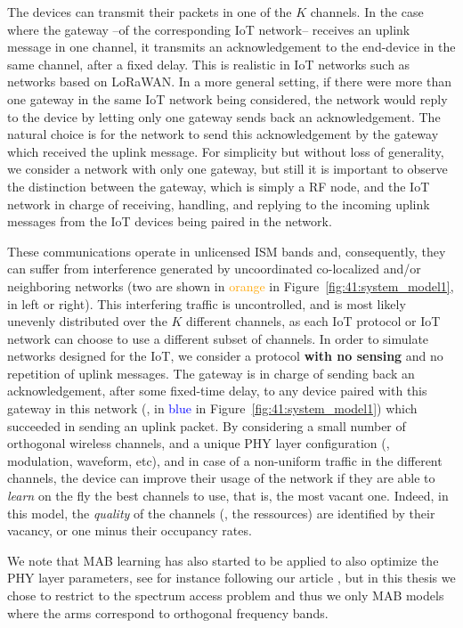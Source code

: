 The devices can transmit their packets in one of the $K$ channels. In the case where the gateway --of the corresponding IoT network-- receives an uplink message in one channel, it transmits an acknowledgement to the end-device in the same channel, after a fixed delay.
This is realistic in IoT networks such as networks based on LoRaWAN.
In a more general setting, if there were more than one gateway in the same IoT network being considered, the network would reply to the device by letting only one gateway sends back an acknowledgement.
The natural choice is for the network to send this acknowledgement by the gateway which received the uplink message.
For simplicity but without loss of generality, we consider a network with only one gateway,
but still it is important to observe the distinction between the gateway, which is simply a RF node, and the IoT network in charge of receiving, handling, and replying to the incoming uplink messages from the IoT devices being paired in the network.
%

These communications operate in unlicensed ISM bands and, consequently, they can suffer from interference generated by uncoordinated co-localized and/or neighboring networks (two are shown in \textcolor{orange}{orange} in Figure~\ref{fig:41:system_model1}, in left or right).
This interfering traffic is uncontrolled, and is most likely unevenly distributed over the $K$ different channels,
as each IoT protocol or IoT network can choose to use a different subset of channels.
%
In order to simulate networks designed for the IoT, we consider a protocol \textbf{with no sensing} and no repetition of uplink messages. The gateway is in charge of sending back an acknowledgement, after some fixed-time delay, to any device paired with this gateway in this network (\ie, in \textcolor{blue}{blue} in Figure~\ref{fig:41:system_model1}) which succeeded in sending an uplink packet.
%
By considering a small number of orthogonal wireless channels, and a unique PHY layer configuration (\ie, modulation, waveform, etc), and in case of a non-uniform traffic in the different channels,
the device can improve their usage of the network if they are able to \emph{learn} on the fly the best channels to use, that is, the most vacant one. Indeed, in this model, the \emph{quality} of the channels (\ie, the ressources) are identified by their vacancy, or one minus their occupancy rates.

We note that MAB learning has also started to be applied to also optimize the PHY layer parameters, see for instance \cite{KerkoucheAlami18} following our article \cite{Bonnefoi17},
but in this thesis we chose to restrict to the spectrum access problem and thus we only MAB models where the arms correspond to orthogonal frequency bands.


